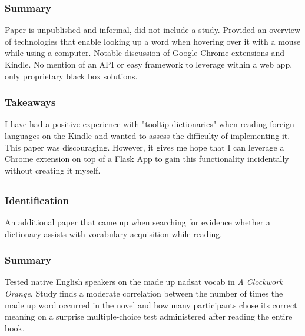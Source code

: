 \documentclass[
	letterpaper, %
]{jdf}
\begin{document}
\subsubsection{Summary}
Paper is unpublished and informal, did not include a study. Provided an overview of technologies that enable looking up a word when hovering over it with a mouse while using a computer. Notable discussion of Google Chrome extensions and Kindle. No mention of an API or easy framework to leverage within a web app, only proprietary black box solutions.

\subsubsection{Takeaways}
I have had a positive experience with "tooltip dictionaries" when reading foreign languages on the Kindle and wanted to assess the difficulty of implementing it. This paper was discouraging. However, it gives me hope that I can leverage a Chrome extension on top of a Flask App to gain this functionality incidentally without creating it myself.

\subsection{}
\subsubsection{Identification}
An additional paper that came up when searching for evidence whether a dictionary assists with vocabulary acquisition while reading.

\subsubsection{Summary}
Tested native English speakers on the made up nadsat vocab in \textit{A Clockwork Orange}. Study finds a moderate correlation between the number of times the made up word occurred in the novel and how many participants chose its correct meaning on a surprise multiple-choice test administered after reading the entire book.
\end{document}

